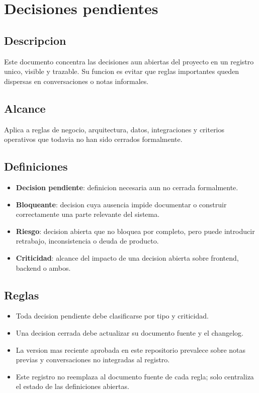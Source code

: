 \section{Decisiones pendientes}

\subsection{Descripcion}

Este documento concentra las decisiones aun abiertas del proyecto en un registro unico, visible y trazable. Su funcion es evitar que reglas importantes queden dispersas en conversaciones o notas informales.

\subsection{Alcance}

Aplica a reglas de negocio, arquitectura, datos, integraciones y criterios operativos que todavia no han sido cerrados formalmente.

\subsection{Definiciones}

\begin{itemize}
  \item \textbf{Decision pendiente}: definicion necesaria aun no cerrada formalmente.
  \item \textbf{Bloqueante}: decision cuya ausencia impide documentar o construir correctamente una parte relevante del sistema.
  \item \textbf{Riesgo}: decision abierta que no bloquea por completo, pero puede introducir retrabajo, inconsistencia o deuda de producto.
  \item \textbf{Criticidad}: alcance del impacto de una decision abierta sobre frontend, backend o ambos.
\end{itemize}

\subsection{Reglas}

\begin{itemize}
  \item Toda decision pendiente debe clasificarse por tipo y criticidad.
  \item Una decision cerrada debe actualizar su documento fuente y el changelog.
  \item La version mas reciente aprobada en este repositorio prevalece sobre notas previas y conversaciones no integradas al registro.
  \item Este registro no reemplaza al documento fuente de cada regla; solo centraliza el estado de las definiciones abiertas.
\end{itemize}

